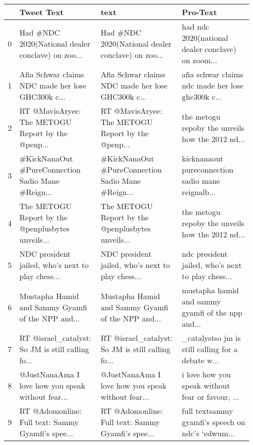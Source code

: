 \begin{tabular}{llll}
\toprule
{} &                                         Tweet Text &                                               text &                                           Pro-Text \\
\midrule
0 &  Had \#NDC 2020(National dealer conclave) on zoo... &  Had \#NDC 2020(National dealer conclave) on zoo... &  had ndc 2020(national dealer conclave) on zoom... \\
1 &  Afia Schwar claims NDC made her lose GHC300k c... &  Afia Schwar claims NDC made her lose GHC300k c... &  afia schwar claims ndc made her lose ghc300k c... \\
2 &  RT @MavisAryee: The METOGU Report by the @penp... &  RT @MavisAryee: The METOGU Report by the @penp... &  the metogu repoby the  unveils how the 2012 nd... \\
3 &  \#KickNanaOut \#PureConnection Sadio Mane \#Reign... &  \#KickNanaOut \#PureConnection Sadio Mane \#Reign... &  kicknanaout pureconnection sadio mane reignalb... \\
4 &  The METOGU Report by the @penplusbytes unveils... &  The METOGU Report by the @penplusbytes unveils... &  the metogu repoby the  unveils how the 2012 nd... \\
5 &  NDC president jailed, who’s next to play chess... &  NDC president jailed, who’s next to play chess... &  ndc president jailed, who’s next to play chess... \\
6 &  Mustapha Hamid and Sammy Gyamfi of the NPP and... &  Mustapha Hamid and Sammy Gyamfi of the NPP and... &  mustapha hamid and sammy gyamfi of the npp and... \\
7 &  RT @israel\_catalyst: So JM is still calling fo... &  RT @israel\_catalyst: So JM is still calling fo... &  \_catalystso jm is still calling for a debate w... \\
8 &  @JustNanaAma I love how you speak without fear... &  @JustNanaAma I love how you speak without fear... &   i love how you speak without fear or favour, ... \\
9 &  RT @Adomonline: Full text: Sammy Gyamfi’s spee... &  RT @Adomonline: Full text: Sammy Gyamfi’s spee... &  full textsammy gyamfi’s speech on ndc’s ‘edwum... \\
\bottomrule
\end{tabular}
